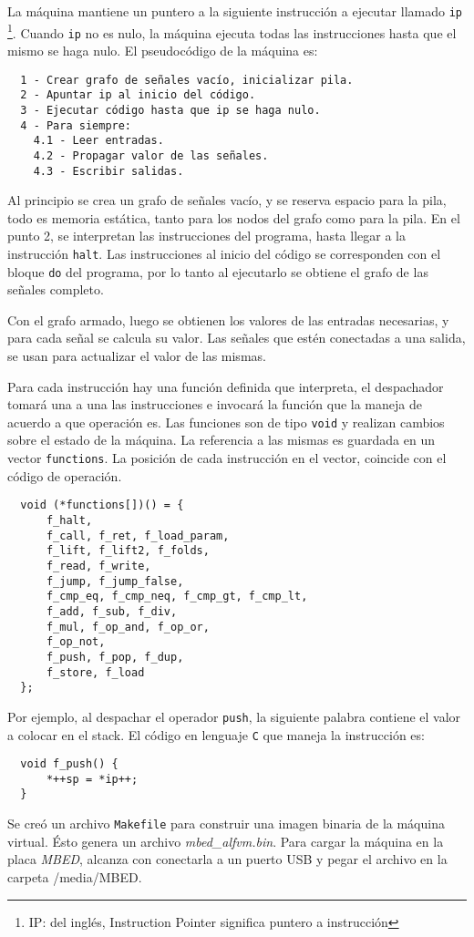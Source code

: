   La máquina mantiene un puntero a la siguiente instrucción a ejecutar llamado
  \texttt{ip} \footnote{IP: del inglés, Instruction Pointer significa puntero a instrucción}.
  Cuando \texttt{ip} no es nulo, la máquina ejecuta todas las instrucciones hasta
  que el mismo se haga nulo.
  El pseudocódigo de la máquina es:

\begin{Verbatim}
  1 - Crear grafo de señales vacío, inicializar pila.
  2 - Apuntar ip al inicio del código.
  3 - Ejecutar código hasta que ip se haga nulo.
  4 - Para siempre:
    4.1 - Leer entradas.
    4.2 - Propagar valor de las señales.
    4.3 - Escribir salidas.
\end{Verbatim}

  Al principio se crea un grafo de señales vacío, y se reserva espacio para la pila, todo es memoria estática, tanto
  para los nodos del grafo como para la pila.
  En el punto 2, se interpretan las instrucciones del programa, hasta llegar a la instrucción \texttt{halt}. Las 
  instrucciones al inicio del código se corresponden con el bloque \texttt{do} del programa, por lo tanto
  al ejecutarlo se obtiene el grafo de las señales completo.

  Con el grafo armado, luego se obtienen los valores de las entradas necesarias, y para cada señal se
  calcula su valor.
  Las señales que estén conectadas a una salida, se usan para actualizar el valor de las mismas.


  Para cada instrucción hay una función definida que interpreta, el despachador
  tomará una a una las instrucciones e invocará la función que la maneja de acuerdo
  a que operación es.
  Las funciones son de tipo \texttt{void} y realizan cambios sobre el estado
  de la máquina. La referencia a las mismas es guardada en un vector \texttt{functions}.
  La posición de cada instrucción en el vector, coincide con el código de operación.

\begin{Verbatim}
  void (*functions[])() = {
      f_halt,
      f_call, f_ret, f_load_param,
      f_lift, f_lift2, f_folds,
      f_read, f_write,
      f_jump, f_jump_false,
      f_cmp_eq, f_cmp_neq, f_cmp_gt, f_cmp_lt,
      f_add, f_sub, f_div,
      f_mul, f_op_and, f_op_or,
      f_op_not,
      f_push, f_pop, f_dup,
      f_store, f_load
  };
\end{Verbatim}

  Por ejemplo, al despachar el operador \texttt{push}, la siguiente palabra contiene
  el valor a colocar en el stack. El código en lenguaje \texttt{C} que maneja la instrucción es:

\begin{Verbatim}
  void f_push() {
      *++sp = *ip++;
  }
\end{Verbatim}

  Se creó un archivo \texttt{Makefile} para construir una imagen
  binaria de la máquina virtual.
  Ésto genera un archivo \emph{mbed\_alfvm.bin}.
  Para cargar la máquina en la placa \textit{MBED}, alcanza con conectarla
a un puerto USB y pegar el archivo en la carpeta /media/MBED.

